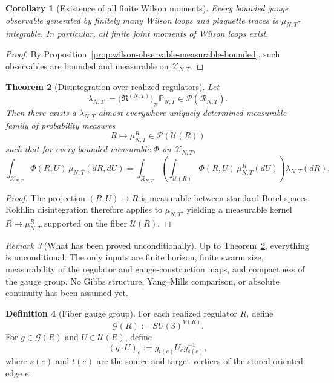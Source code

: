 \documentclass[11pt]{article}
\newtheorem{theorem}{Theorem}[section]
\newtheorem{corollary}[theorem]{Corollary}
\theoremstyle{definition}
\newtheorem{definition}[theorem]{Definition}
\theoremstyle{remark}
\newtheorem{remark}[theorem]{Remark}
\begin{document}
\begin{corollary}[Existence of all finite Wilson moments]
\label{cor:finite-wilson-moments}
Every bounded gauge observable generated by finitely many Wilson loops and
plaquette traces is \(\mu_{N,T}\)-integrable. In particular, all finite joint
moments of Wilson loops exist.
\end{corollary}

\begin{proof}
By Proposition~\ref{prop:wilson-observable-measurable-bounded}, such
observables are bounded and measurable on \(\mathscr X_{N,T}\).
\end{proof}

\begin{theorem}[Disintegration over realized regulators]
\label{thm:disintegration-over-regulators}
Let
\[
\lambda_{N,T}:=\bigl(\mathfrak R^{(N,T)}\bigr)_{\#}\mathbb P_{N,T}\in\mathcal P(\mathscr R_{N,T}).
\]
Then there exists a \(\lambda_{N,T}\)-almost everywhere uniquely determined
measurable family of probability measures
\[
R\mapsto \mu_{N,T}^R\in\mathcal P(\mathscr U(R))
\]
such that for every bounded measurable \(\Phi\) on \(\mathscr X_{N,T}\),
\[
\int_{\mathscr X_{N,T}}\Phi(R,U)\,\mu_{N,T}(dR,dU)
=
\int_{\mathscr R_{N,T}}
\left(
\int_{\mathscr U(R)}\Phi(R,U)\,\mu_{N,T}^R(dU)
\right)
\lambda_{N,T}(dR).
\]
\end{theorem}

\begin{proof}
The projection \((R,U)\mapsto R\) is measurable between standard Borel spaces.
Rokhlin disintegration therefore applies to \(\mu_{N,T}\), yielding a
measurable kernel \(R\mapsto\mu_{N,T}^R\) supported on the fiber \(\mathscr U(R)\).
\end{proof}

\begin{remark}[What has been proved unconditionally]
\label{rem:unconditional-part}
Up to Theorem~\ref{thm:disintegration-over-regulators}, everything is
unconditional. The only inputs are finite horizon, finite swarm size,
measurability of the regulator and gauge-construction maps, and compactness of
the gauge group. No Gibbs structure, Yang--Mills comparison, or absolute
continuity has been assumed yet.
\end{remark}

\begin{definition}[Fiber gauge group]
\label{def:fiber-gauge-group}
For each realized regulator \(R\), define
\[
\mathcal G(R):=SU(3)^{V(R)}.
\]
For \(g\in\mathcal G(R)\) and \(U\in\mathscr U(R)\), define
\[
(g\cdot U)_e:=g_{t(e)}U_e g_{s(e)}^{-1},
\]
where \(s(e)\) and \(t(e)\) are the source and target vertices of the stored
oriented edge \(e\).
\end{definition}
\end{document}
